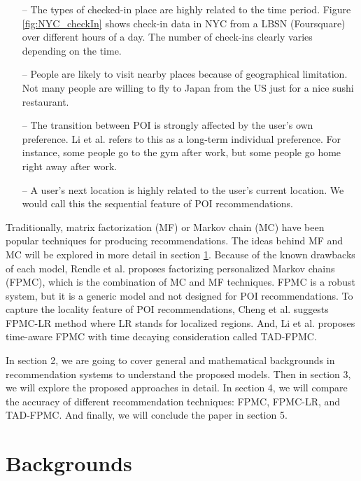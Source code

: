 \documentclass{sig-alternate}
\begin{document}
\begin{itemize}
\item[--] The types of checked-in place are highly related to the time period. Figure \ref{fig:NYC_checkIn} shows check-in data in 
NYC from a LBSN (Foursquare) over different hours of a day. The number of check-ins clearly varies depending 
on the time.
\item[--] People are likely to visit nearby places because of geographical limitation. Not many people are willing 
to fly to Japan from the US just for a nice sushi restaurant.
\item[--] The transition between POI is strongly affected by the user's own preference. Li et al. \cite{Li:2017} refers to this as a long-term individual preference. For instance, some people go to the gym after work, but some people go home right away after work. 
\item[--] A user's next location is highly related to the user's current location. We would call this the sequential feature of POI recommendations. 
\end{itemize}



Traditionally, matrix factorization (MF) or Markov chain (MC) have been popular techniques for producing recommendations.
The ideas behind MF and MC will be explored in more detail in section \ref{sec:backgrounds}. 
Because of the known drawbacks of each model, Rendle et al. \cite{Rendle:2010:FPM} proposes factorizing personalized 
Markov chains (FPMC), which is the combination of MC and MF techniques. FPMC is a robust system, 
but it is a generic model and not designed for POI recommendations. To capture the locality feature of 
POI recommendations, Cheng et al. \cite{Cheng:2013} suggests FPMC-LR method where LR stands for localized regions. 
And, Li et al. \cite{Li:2017} proposes time-aware FPMC with time decaying consideration called TAD-FPMC.

In section 2, we are going to cover general and mathematical backgrounds in recommendation systems 
to understand the proposed models. Then in section 3, we will explore the proposed approaches in detail. 
In section 4, we will compare the accuracy of different recommendation techniques: FPMC, FPMC-LR, and TAD-FPMC. 
And finally, we will conclude the paper in section 5.



\section{Backgrounds}
\label{sec:backgrounds}
\end{document}

